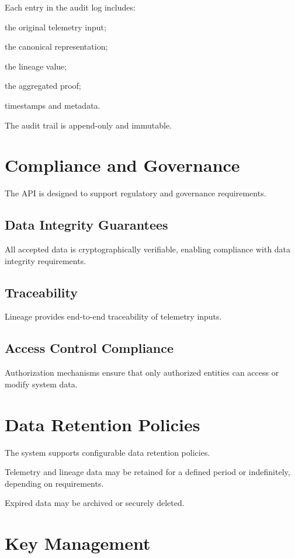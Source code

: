 Each entry in the audit log includes:

the original telemetry input;

the canonical representation;

the lineage value;

the aggregated proof;

timestamps and metadata.

The audit trail is append-only and immutable.

\section{Compliance and Governance}

The API is designed to support regulatory and governance requirements.

\subsection{Data Integrity Guarantees}

All accepted data is cryptographically verifiable, enabling compliance with data integrity requirements.

\subsection{Traceability}

Lineage provides end-to-end traceability of telemetry inputs.

\subsection{Access Control Compliance}

Authorization mechanisms ensure that only authorized entities can access or modify system data.

\section{Data Retention Policies}

The system supports configurable data retention policies.

Telemetry and lineage data may be retained for a defined period or indefinitely, depending on requirements.

Expired data may be archived or securely deleted.

\section{Key Management}

